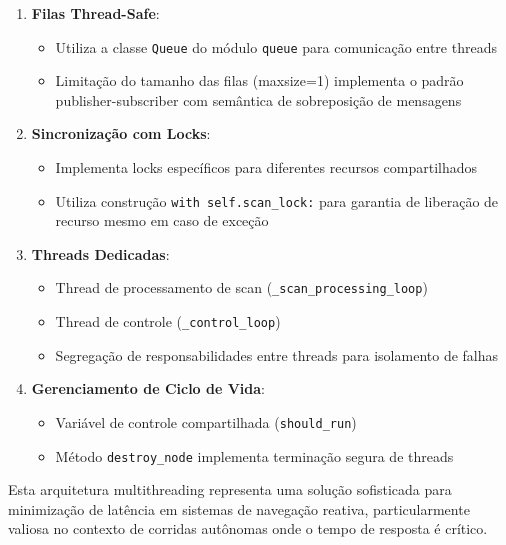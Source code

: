 \begin{enumerate}
    \item \textbf{Filas Thread-Safe}:
          \begin{itemize}
              \item Utiliza a classe \texttt{Queue} do módulo \texttt{queue} para comunicação entre
                    threads
              \item Limitação do tamanho das filas (maxsize=1) implementa o padrão
                    publisher-subscriber com semântica de sobreposição de mensagens
          \end{itemize}

    \item \textbf{Sincronização com Locks}:
          \begin{itemize}
              \item Implementa locks específicos para diferentes recursos compartilhados
              \item Utiliza construção \texttt{with self.scan\_lock:} para garantia de liberação de
                    recurso mesmo em caso de exceção
          \end{itemize}

    \item \textbf{Threads Dedicadas}:
          \begin{itemize}
              \item Thread de processamento de scan (\texttt{\_scan\_processing\_loop})
              \item Thread de controle (\texttt{\_control\_loop})
              \item Segregação de responsabilidades entre threads para isolamento de falhas
          \end{itemize}

    \item \textbf{Gerenciamento de Ciclo de Vida}:
          \begin{itemize}
              \item Variável de controle compartilhada (\texttt{should\_run})
              \item Método \texttt{destroy\_node} implementa terminação segura de threads
          \end{itemize}
\end{enumerate}

Esta arquitetura multithreading representa uma solução sofisticada para
minimização de latência em sistemas de navegação reativa, particularmente
valiosa no contexto de corridas autônomas onde o tempo de resposta é crítico.

